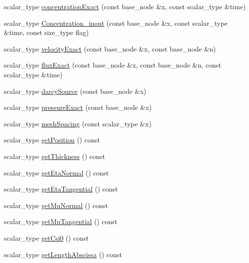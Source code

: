 \begin{DoxyCompactItemize}
\item 
scalar\-\_\-type \hyperlink{classFractureData_a362710c6c9008fde0d358069eb2808d8}{concentration\-Exact} (const base\-\_\-node \&x, const scalar\-\_\-type \&time)
\item 
scalar\-\_\-type \hyperlink{classFractureData_ab4d202a7f72611e4bc41a5e081b32f2c}{Concentration\-\_\-inout} (const base\-\_\-node \&x, const scalar\-\_\-type \&time, const size\-\_\-type flag)
\item 
scalar\-\_\-type \hyperlink{classFractureData_a8342142df05ded99f3a6c8d39dbfdc0e}{velocity\-Exact} (const base\-\_\-node \&x, const base\-\_\-node \&n)
\item 
scalar\-\_\-type \hyperlink{classFractureData_a92b86995549b500674b955113fc6725d}{flux\-Exact} (const base\-\_\-node \&x, const base\-\_\-node \&n, const scalar\-\_\-type \&time)
\item 
scalar\-\_\-type \hyperlink{classFractureData_a8f935d962ae1bd93ca3e3b0955517db5}{darcy\-Source} (const base\-\_\-node \&x)
\item 
scalar\-\_\-type \hyperlink{classFractureData_aa90769a75aff6485824ecd2090c8b4ee}{pressure\-Exact} (const base\-\_\-node \&x)
\item 
scalar\-\_\-type \hyperlink{classFractureData_ab79d66dd830b6e1c55ade0d940c5c8cf}{mesh\-Spacing} (const scalar\-\_\-type \&x)
\item 
scalar\-\_\-type \hyperlink{classFractureData_af86187ca0c7cc0ea6f4c3cd6e1a4cf41}{get\-Position} () const 
\item 
scalar\-\_\-type \hyperlink{classFractureData_a3ecc0d132f9cc105af6b24d676a7b9c5}{get\-Thickness} () const 
\item 
scalar\-\_\-type \hyperlink{classFractureData_a9acc76c77282d4b5d0cdca18c2b1b9ea}{get\-Eta\-Normal} () const 
\item 
scalar\-\_\-type \hyperlink{classFractureData_a7378053b4009825b4a2957484cb2a5e8}{get\-Eta\-Tangential} () const 
\item 
scalar\-\_\-type \hyperlink{classFractureData_ab059ac23b93115e05029e1b6cadd1cd9}{get\-Mu\-Normal} () const 
\item 
scalar\-\_\-type \hyperlink{classFractureData_a1ac3cca1ae035eedb2ec89c0517f8b1f}{get\-Mu\-Tangential} () const 
\item 
scalar\-\_\-type \hyperlink{classFractureData_a7b75512224a34953960a9bd09f1af661}{get\-Csi0} () const 
\item 
scalar\-\_\-type \hyperlink{classFractureData_abaebcf16d83713858e25837939ad3161}{get\-Length\-Abscissa} () const 

\end{DoxyCompactItemize}
